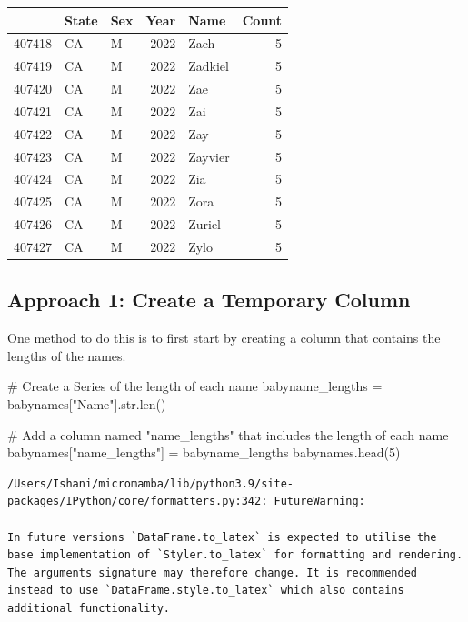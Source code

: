 \documentclass[
  letterpaper,
  DIV=11,
  numbers=noendperiod]{scrreprt}
\newenvironment{Shaded}{\begin{snugshade}}{\end{snugshade}}
\newcommand{\BuiltInTok}[1]{\textcolor[rgb]{0.00,0.23,0.31}{#1}}
\newcommand{\CommentTok}[1]{\textcolor[rgb]{0.37,0.37,0.37}{#1}}
\newcommand{\DecValTok}[1]{\textcolor[rgb]{0.68,0.00,0.00}{#1}}
\newcommand{\NormalTok}[1]{\textcolor[rgb]{0.00,0.23,0.31}{#1}}
\newcommand{\OperatorTok}[1]{\textcolor[rgb]{0.37,0.37,0.37}{#1}}
\newcommand{\StringTok}[1]{\textcolor[rgb]{0.13,0.47,0.30}{#1}}
\begin{document}
\begin{tabular}{lllrlr}
\toprule
{} & State & Sex &  Year &     Name &  Count \\
\midrule
407418 &    CA &   M &  2022 &     Zach &      5 \\
407419 &    CA &   M &  2022 &  Zadkiel &      5 \\
407420 &    CA &   M &  2022 &      Zae &      5 \\
407421 &    CA &   M &  2022 &      Zai &      5 \\
407422 &    CA &   M &  2022 &      Zay &      5 \\
407423 &    CA &   M &  2022 &  Zayvier &      5 \\
407424 &    CA &   M &  2022 &      Zia &      5 \\
407425 &    CA &   M &  2022 &     Zora &      5 \\
407426 &    CA &   M &  2022 &   Zuriel &      5 \\
407427 &    CA &   M &  2022 &     Zylo &      5 \\
\bottomrule
\end{tabular}

\hypertarget{approach-1-create-a-temporary-column}{%
\subsection{Approach 1: Create a Temporary
Column}\label{approach-1-create-a-temporary-column}}

One method to do this is to first start by creating a column that
contains the lengths of the names.

\begin{Shaded}
\begin{Highlighting}[]
\CommentTok{\# Create a Series of the length of each name}
\NormalTok{babyname\_lengths }\OperatorTok{=}\NormalTok{ babynames[}\StringTok{"Name"}\NormalTok{].}\BuiltInTok{str}\NormalTok{.}\BuiltInTok{len}\NormalTok{()}

\CommentTok{\# Add a column named "name\_lengths" that includes the length of each name}
\NormalTok{babynames[}\StringTok{"name\_lengths"}\NormalTok{] }\OperatorTok{=}\NormalTok{ babyname\_lengths}
\NormalTok{babynames.head(}\DecValTok{5}\NormalTok{)}
\end{Highlighting}
\end{Shaded}

\begin{verbatim}
/Users/Ishani/micromamba/lib/python3.9/site-packages/IPython/core/formatters.py:342: FutureWarning:

In future versions `DataFrame.to_latex` is expected to utilise the base implementation of `Styler.to_latex` for formatting and rendering. The arguments signature may therefore change. It is recommended instead to use `DataFrame.style.to_latex` which also contains additional functionality.
\end{verbatim}
\end{document}
